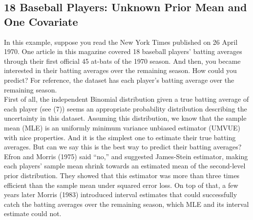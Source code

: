 \documentclass[article]{jss}
\begin{document}
\subsection[Unknown Second-level Mean and One Covariate]{18 Baseball Players: Unknown Prior Mean and One Covariate}
In this example, suppose you read the New York Times published on 26 April 1970. One article in this magazine covered 18 baseball players' batting averages through their first official 45 at-bats of the 1970 season. And then, you became interested in their batting averages over the remaining season. How could you predict? For reference, the dataset   has each player's batting average over the remaining season. 
\\

First of all, the independent Binomial distribution given a true batting average of each player (see (7)) seems an appropriate probability distribution describing the uncertainty in this dataset. Assuming this distribution, we know that the sample mean (MLE) is an uniformly minimum variance unbiased estimator (UMVUE) with nice properties. And it is the simplest one to estimate their true batting averages. But can we say this is the best way to predict their batting averages?
\\

Efron and Morris (1975) said ``no,'' and suggested James-Stein estimator, making each players' sample mean shrink towards an estimated mean of the second-level prior distribution. They showed that this estimator was more than three times efficient than the sample mean under squared error loss. On top of that, a few years later Morris (1983) introduced interval estimates that could successfully catch the batting averages over the remaining season, which MLE and its interval estimate could not.
\\
\end{document}
